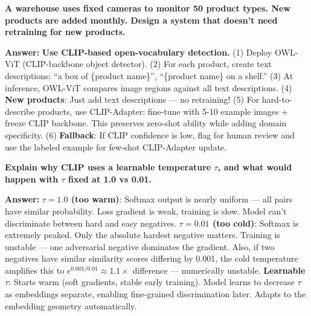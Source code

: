 \begin{examq}
\textbf{A warehouse uses fixed cameras to monitor 50 product types. New products are added monthly. Design a system that doesn't need retraining for new products.}

\textbf{Answer:} \textbf{Use CLIP-based open-vocabulary detection.} (1) Deploy OWL-ViT (CLIP-backbone object detector). (2) For each product, create text descriptions: ``a box of \{product name\}'', ``\{product name\} on a shelf.'' (3) At inference, OWL-ViT compares image regions against all text descriptions. (4) \textbf{New products}: Just add text descriptions — no retraining! (5) For hard-to-describe products, use CLIP-Adapter: fine-tune with 5-10 example images + freeze CLIP backbone. This preserves zero-shot ability while adding domain specificity. (6) \textbf{Fallback}: If CLIP confidence is low, flag for human review and use the labeled example for few-shot CLIP-Adapter update.
\end{examq}

\begin{examq}
\textbf{Explain why CLIP uses a learnable temperature $\tau$, and what would happen with $\tau$ fixed at 1.0 vs 0.01.}

\textbf{Answer:} \textbf{$\tau = 1.0$ (too warm)}: Softmax output is nearly uniform — all pairs have similar probability. Loss gradient is weak, training is slow. Model can't discriminate between hard and easy negatives. \textbf{$\tau = 0.01$ (too cold)}: Softmax is extremely peaked. Only the absolute hardest negative matters. Training is unstable — one adversarial negative dominates the gradient. Also, if two negatives have similar similarity scores differing by 0.001, the cold temperature amplifies this to $e^{0.001/0.01} \approx 1.1\times$ difference — numerically unstable. \textbf{Learnable $\tau$}: Starts warm (soft gradients, stable early training). Model learns to decrease $\tau$ as embeddings separate, enabling fine-grained discrimination later. Adapts to the embedding geometry automatically.
\end{examq}

